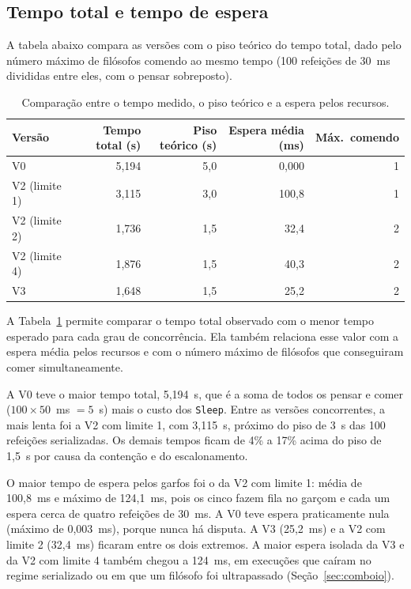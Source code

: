 \documentclass[12pt,brazil,a4paper]{article}
\begin{document}
\subsection{Tempo total e tempo de espera}
A tabela abaixo compara as versões com o piso teórico do tempo total, dado pelo número máximo de filósofos comendo ao mesmo tempo (100 refeições de 30~ms divididas entre eles, com o pensar sobreposto).

\begin{table}[H]
\centering
\small
\begin{tabular}{lrrrr}
\toprule
Versão & Tempo total (s) & Piso teórico (s) & Espera média (ms) & Máx.\ comendo\\
\midrule
V0 & 5,194 & 5,0 & 0,000 & 1\\
V2 (limite 1) & 3,115 & 3,0 & 100,8 & 1\\
V2 (limite 2) & 1,736 & 1,5 & 32,4 & 2\\
V2 (limite 4) & 1,876 & 1,5 & 40,3 & 2\\
V3 & 1,648 & 1,5 & 25,2 & 2\\
\bottomrule
\end{tabular}
\caption{Comparação entre o tempo medido, o piso teórico e a espera pelos recursos.}
\label{tab:piso-teorico}
\end{table}

A Tabela~\ref{tab:piso-teorico} permite comparar o tempo total observado com o menor tempo esperado para cada grau de concorrência. Ela também relaciona esse valor com a espera média pelos recursos e com o número máximo de filósofos que conseguiram comer simultaneamente.

A V0 teve o maior tempo total, 5,194~s, que é a soma de todos os pensar e comer ($100\times50$~ms $=5$~s) mais o custo dos \texttt{Sleep}. Entre as versões concorrentes, a mais lenta foi a V2 com limite 1, com 3,115~s, próximo do piso de 3~s das 100 refeições serializadas. Os demais tempos ficam de 4\% a 17\% acima do piso de 1,5~s por causa da contenção e do escalonamento.

O maior tempo de espera pelos garfos foi o da V2 com limite 1: média de 100,8~ms e máximo de 124,1~ms, pois os cinco fazem fila no garçom e cada um espera cerca de quatro refeições de 30~ms. A V0 teve espera praticamente nula (máximo de 0,003~ms), porque nunca há disputa. A V3 (25,2~ms) e a V2 com limite 2 (32,4~ms) ficaram entre os dois extremos. A maior espera isolada da V3 e da V2 com limite 4 também chegou a 124~ms, em execuções que caíram no regime serializado ou em que um filósofo foi ultrapassado (Seção~\ref{sec:comboio}).
\end{document}
